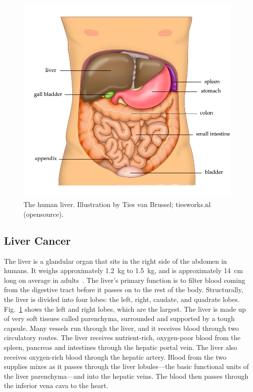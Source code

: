 \begin{figure}[!t]
\centering
\includegraphics[width = 0.75\columnwidth]{./Images/Chapter1/liverIllustration.jpg}%
\caption[The human liver]{The human liver. Illustration by Ties van Brussel; tiesworks.nl (opensource).}
\label{fig:Ch1LiverAnatomy}
\end{figure} 

\subsection{Liver Cancer}
The liver is a glandular organ that sits in the right side of the abdomen in humans. It weighs approximately 1.2~kg to 1.5~kg, and is approximately 14~cm long on average in adults~\cite{Wolf1990,Kratzer2003}. The liver's primary function is to filter blood coming from the digestive tract before it passes on to the rest of the body. Structurally, the liver is divided into four lobes: the left, right, caudate, and quadrate lobes. Fig.~\ref{fig:Ch1LiverAnatomy} shows the left and right lobes, which are the largest. The liver is made up of very soft tissues called parenchyma, surrounded and supported by a tough capsule. Many vessels run through the liver, and it receives blood through two circulatory routes. The liver receives nutrient-rich, oxygen-poor blood from the spleen, pancreas and intestines through the hepatic portal vein. The liver also receives oxygen-rich blood through the hepatic artery. Blood from the two supplies mixes as it passes through the liver lobules---the basic functional units of the liver parenchyma---and into the hepatic veins. The blood then passes through the inferior vena cava to the heart.
   
